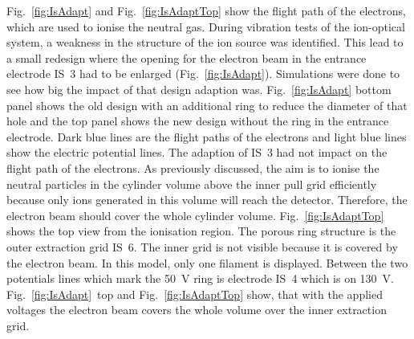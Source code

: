 	Fig.~\ref{fig:IsAdapt} and Fig.~\ref{fig:IsAdaptTop} show the flight path of the electrons, which are used to ionise the neutral gas. During vibration tests of the ion-optical system, a weakness in the structure of the ion source was identified. This lead to a small redesign where the opening for the electron beam in the entrance electrode IS~3 had to be enlarged (Fig.~\ref{fig:IsAdapt}). Simulations were done to see how big the impact of that design adaption was. Fig.~\ref{fig:IsAdapt} bottom panel shows the old design with an additional ring to reduce the diameter of that hole and the top panel shows the new design without the ring in the entrance electrode. Dark blue lines are the flight paths of the electrons and light blue lines show the electric potential lines. The adaption of IS~3 had not impact on the flight path of the electrons. As previously discussed, the aim is to ionise the neutral particles in the cylinder volume above the inner pull grid efficiently because only ions generated in this volume will reach the detector. Therefore, the electron beam should cover the whole cylinder volume. Fig.~\ref{fig:IsAdaptTop} shows the top view from the ionisation region. The porous ring structure is the outer extraction grid IS~6. The inner grid is not visible because it is covered by the electron beam. In this model, only one filament is displayed. Between the two potentials lines which mark the 50~V ring is electrode IS~4 which is on 130~V. Fig.~\ref{fig:IsAdapt}~top and Fig.~\ref{fig:IsAdaptTop} show, that with the applied voltages the electron beam covers the whole volume over the inner extraction grid.
	\newpage
	
	
